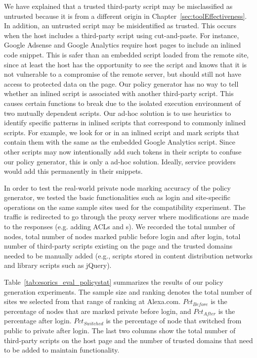   We have explained that a trusted third-party script may be misclassified as untrusted because it is from a different origin in Chapter~\ref{sec:toolEffectiveness}.  In addition, an untrusted script may be misidentified as trusted.  This occurs when the host includes a third-party script using cut-and-paste.  For instance, Google Adsense and Google Analytics require host pages to include an inlined code snippet.  This is safer than an embedded script loaded from the remote site, since at least the host has the opportunity to see the script and knows that it is not vulnerable to a compromise of the remote server, but should still not have access to protected data on the page.  Our policy generator has no way to tell whether an inlined script is associated with another third-party script.  This causes certain functions to break due to the isolated execution environment of two mutually dependent scripts.  Our ad-hoc solution is to use heuristics to identify specific patterns in inlined scripts that correspond to commonly inlined scripts.  For example, we look for  or  in an inlined script and mark scripts that contain them with the same  as the embedded Google Analytics script.  Since other scripts may now intentionally add such tokens in their scripts to confuse our policy generator, this is only a ad-hoc solution.  Ideally, service providers would add this  permanently in their snippets.

 In order to test the real-world private node marking accuracy of the policy generator, we tested the basic functionalities such as login and site-specific operations on the same sample sites used for the compatibility experiment.  The traffic is redirected to go through the proxy server where modifications are made to the responses (e.g. adding ACLs and s).  We recorded the total number of nodes, total number of nodes marked public before login and after login, total number of third-party scripts existing on the page and the trusted domains needed to be manually added (e.g., scripts stored in content distribution networks and library scripts such as jQuery).



Table~\ref{tab:esorics_eval_policystat} summarizes the results of our policy generation experiments.  The sample size and ranking denotes the total number of sites we selected from that range of ranking at Alexa.com.  ${Pct}_{Before}$ is the percentage of nodes that are marked private before login, and ${Pct}_{After}$ is the percentage after login.  ${Pct}_{Switched}$ is the percentage of node that switched from public to private after login.  The last two columns show the total number of third-party scripts on the host page and the number of trusted domains that need to be added to maintain functionality.

